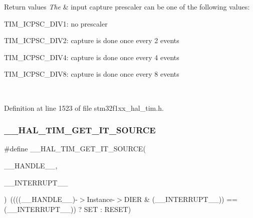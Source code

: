 \begin{DoxyRetVals}{Return values}
{\em The} & input capture prescaler can be one of the following values\+: \begin{DoxyItemize}
\item T\+I\+M\+\_\+\+I\+C\+P\+S\+C\+\_\+\+D\+I\+V1\+: no prescaler \item T\+I\+M\+\_\+\+I\+C\+P\+S\+C\+\_\+\+D\+I\+V2\+: capture is done once every 2 events \item T\+I\+M\+\_\+\+I\+C\+P\+S\+C\+\_\+\+D\+I\+V4\+: capture is done once every 4 events \item T\+I\+M\+\_\+\+I\+C\+P\+S\+C\+\_\+\+D\+I\+V8\+: capture is done once every 8 events \end{DoxyItemize}
\\
\hline
\end{DoxyRetVals}


Definition at line 1523 of file stm32f1xx\+\_\+hal\+\_\+tim.\+h.

\mbox{\label{group___t_i_m___exported___macros_ga644babf93470a6eee6bce8906c4da5c5}} 
\subsubsection{\texorpdfstring{\+\_\+\+\_\+\+H\+A\+L\+\_\+\+T\+I\+M\+\_\+\+G\+E\+T\+\_\+\+I\+T\+\_\+\+S\+O\+U\+R\+CE}{\_\_HAL\_TIM\_GET\_IT\_SOURCE}}
{\footnotesize\ttfamily \#define \+\_\+\+\_\+\+H\+A\+L\+\_\+\+T\+I\+M\+\_\+\+G\+E\+T\+\_\+\+I\+T\+\_\+\+S\+O\+U\+R\+CE(\begin{DoxyParamCaption}\item[{}]{\+\_\+\+\_\+\+H\+A\+N\+D\+L\+E\+\_\+\+\_\+,  }\item[{}]{\+\_\+\+\_\+\+I\+N\+T\+E\+R\+R\+U\+P\+T\+\_\+\+\_\+ }\end{DoxyParamCaption})~((((\+\_\+\+\_\+\+H\+A\+N\+D\+L\+E\+\_\+\+\_\+)-\/$>$Instance-\/$>$D\+I\+ER \& (\+\_\+\+\_\+\+I\+N\+T\+E\+R\+R\+U\+P\+T\+\_\+\+\_\+)) == (\+\_\+\+\_\+\+I\+N\+T\+E\+R\+R\+U\+P\+T\+\_\+\+\_\+)) ? S\+ET \+: R\+E\+S\+ET)}



